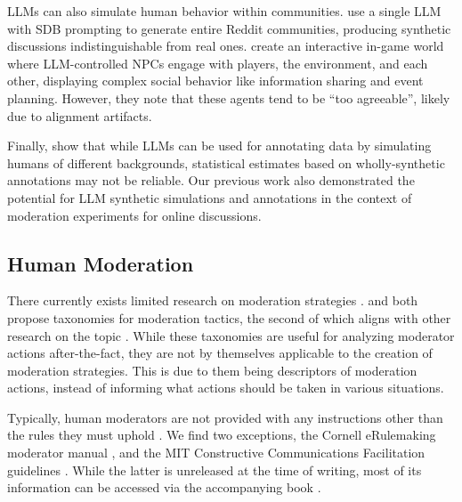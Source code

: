 \acp{LLM} can also simulate human behavior within communities. \citet{park2022socialsimulacracreatingpopulated} use a single \ac{LLM} with \ac{SDB} prompting to generate entire Reddit communities, producing synthetic discussions indistinguishable from real ones. \citet{Park2023GenerativeAI} create an interactive in-game world where \ac{LLM}-controlled \acp{NPC} engage with players, the environment, and each other, displaying complex social behavior like information sharing and event planning. However, they note that these agents tend to be “too agreeable”, likely due to alignment artifacts.

Finally, \citet{Gligoric2024CanUL} show that while \acp{LLM} can be used for annotating data by simulating humans of different backgrounds, statistical estimates based on wholly-synthetic annotations may not be reliable. Our previous work \cite{dtsirmpas_thesis} also demonstrated the potential for \ac{LLM} synthetic simulations and annotations in the context of moderation experiments for online discussions.


\subsection{Human Moderation}

There currently exists limited research on moderation strategies \cite{korre2025evaluation, make_reddit_great}. \citet{cheung-et-al-2011} and \citet{park_et_al_2012_facilitation} both propose taxonomies for moderation tactics, the second of which aligns with other research on the topic \cite{seering_self_moderation}. While these taxonomies are useful for analyzing moderator actions after-the-fact, they are not by themselves applicable to the creation of moderation strategies. This is due to them being descriptors of moderation actions, instead of informing what actions should be taken in various situations.

Typically, human moderators are not provided with any instructions other than the rules they must uphold \cite{seering_self_moderation, schaffner_community_guidelines}. We find two exceptions, the Cornell eRulemaking moderator manual \cite{Cornell_eRulemaking2017}, and the MIT Constructive Communications Facilitation guidelines \cite{dimitra-guide}. While the latter is unreleased at the time of writing, most of its information can be accessed via the accompanying book \cite{dimitra-book}.

